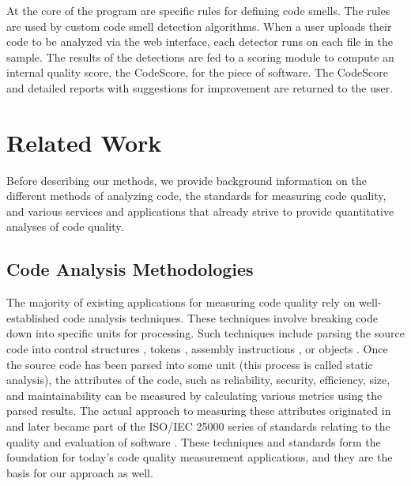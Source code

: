 \documentclass{sig-alternate}
\begin{document}
At the core of the program are specific rules for defining code
smells. The rules are used by custom code smell detection algorithms. When a
user uploads their code to be analyzed via the web interface, each detector runs on each file in the
sample. The results of the detections are fed to a scoring module to compute an
internal quality score, the CodeScore, for the piece of software. The CodeScore
and detailed reports with suggestions for improvement are returned to the user.

\section{Related Work}
\label{sec:related_work}
Before describing our methods, we provide background information
on the different methods of analyzing code, the standards for measuring code
quality, and various services and applications that already strive to provide
quantitative analyses of code quality.

\subsection{Code Analysis Methodologies}
The majority of existing applications for measuring code quality rely on
well-established code analysis techniques. These techniques involve breaking
code down into specific units for processing. Such
techniques include parsing the source code into control structures
\cite{mccabe1976complexity}, tokens \cite{halstead1977elements}, assembly
instructions \cite{park1992software}, or objects \cite{chidamber1994metrics}.
Once the source code has been parsed into some unit (this process is called
static analysis), the attributes of the code, such as reliability, security,
efficiency, size, and maintainability can be measured by calculating various
metrics using the parsed results.
The actual approach to measuring these attributes originated in\cite{boehm1976quantitative}
and later became part of the ISO/IEC 25000 series
of standards relating to the quality and evaluation of software
\cite{iso2011iec}. These techniques and standards form the foundation for
today's code quality measurement applications, and they are the basis for our
approach as well.
\end{document}
